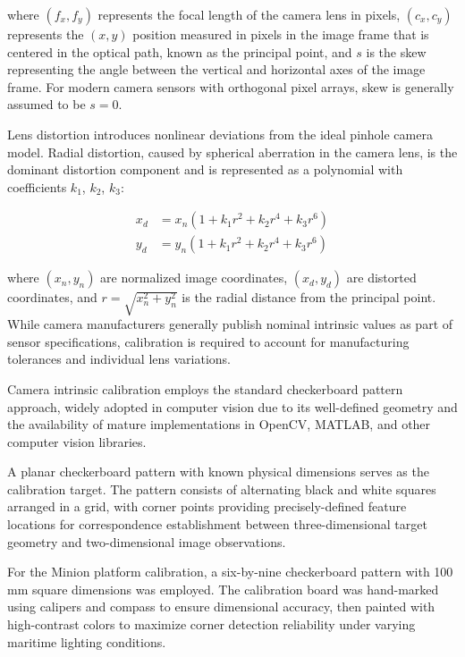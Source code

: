 where $(f_x, f_y)$ represents the focal length of the camera lens in pixels, $(c_x, c_y)$ represents the $(x, y)$ position measured in pixels in the image frame that is centered in the optical path, known as the principal point, and $s$ is the skew representing the angle between the vertical and horizontal axes of the image frame.
For modern camera sensors with orthogonal pixel arrays, skew is generally assumed to be $s = 0$.

Lens distortion introduces nonlinear deviations from the ideal pinhole camera model.
Radial distortion, caused by spherical aberration in the camera lens, is the dominant distortion component and is represented as a polynomial with coefficients $k_1$, $k_2$, $k_3$:

\begin{equation} \label{eq:spherical_distortion}
\begin{split}
x_d &= x_n(1 + k_1 r^2 + k_2 r^4 + k_3 r^6) \\
y_d &= y_n(1 + k_1 r^2 + k_2 r^4 + k_3 r^6)
\end{split}
\end{equation}

where $(x_n, y_n)$ are normalized image coordinates, $(x_d, y_d)$ are distorted coordinates, and $r = \sqrt{x_n^2 + y_n^2}$ is the radial distance from the principal point.
While camera manufacturers generally publish nominal intrinsic values as part of sensor specifications, calibration is required to account for manufacturing tolerances and individual lens variations.


Camera intrinsic calibration employs the standard checkerboard pattern approach, widely adopted in computer vision due to its well-defined geometry and the availability of mature implementations in OpenCV, MATLAB, and other computer vision libraries.


A planar checkerboard pattern with known physical dimensions serves as the calibration target.
The pattern consists of alternating black and white squares arranged in a grid, with corner points providing precisely-defined feature locations for correspondence establishment between three-dimensional target geometry and two-dimensional image observations.

For the Minion platform calibration, a six-by-nine checkerboard pattern with 100 mm square dimensions was employed.
The calibration board was hand-marked using calipers and compass to ensure dimensional accuracy, then painted with high-contrast colors to maximize corner detection reliability under varying maritime lighting conditions.

